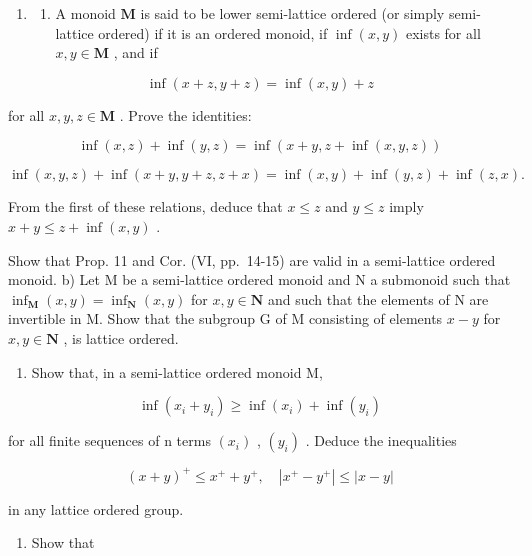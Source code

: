 \begin{enumerate}
\def\labelenumi{\arabic{enumi})}
\setcounter{enumi}{12}
\tightlist
\item
  \begin{enumerate}
  \def\labelenumii{\alph{enumii})}
  \tightlist
  \item
    A monoid \(\mathbf{M}\) is said to be lower semi-lattice ordered (or simply semi-lattice ordered) if it is an ordered monoid, if \(\inf(x, y)\) exists for all \(x, y \in \mathbf{M}\) , and if
  \end{enumerate}
\end{enumerate}

\[
\inf (x + z, y + z) = \inf (x, y) + z
\]

for all \(x, y, z \in \mathbf{M}\) . Prove the identities:

\[
\inf (x, z) + \inf (y, z) = \inf (x + y, z + \inf (x, y, z))
\]

\[
\inf (x, y, z) + \inf (x + y, y + z, z + x) = \inf (x, y) + \inf (y, z) + \inf (z, x).
\]

From the first of these relations, deduce that \(x \leqslant z\) and \(y \leqslant z\) imply \(x + y \leqslant z + \inf(x, y)\) .

Show that Prop. 11 and Cor. (VI, pp.~14-15) are valid in a semi-lattice ordered monoid. b) Let M be a semi-lattice ordered monoid and N a submonoid such that \(\inf_{\mathbf{M}}(x,y) = \inf_{\mathbf{N}}(x,y)\) for \(x,y\in \mathbf{N}\) and such that the elements of N are invertible in M. Show that the subgroup G of M consisting of elements \(x - y\) for \(x,y\in \mathbf{N}\) , is lattice ordered.

\begin{enumerate}
\def\labelenumi{\arabic{enumi})}
\setcounter{enumi}{13}
\tightlist
\item
  Show that, in a semi-lattice ordered monoid M,
\end{enumerate}

\[
\inf \left(x _ {i} + y _ {i}\right) \geqslant \inf \left(x _ {i}\right) + \inf \left(y _ {i}\right)
\]

for all finite sequences of n terms \((x_{i})\) , \((y_{i})\) . Deduce the inequalities

\[
(x + y) ^ {+} \leqslant x ^ {+} + y ^ {+}, \quad | x ^ {+} - y ^ {+} | \leqslant | x - y |
\]

in any lattice ordered group.

\begin{enumerate}
\def\labelenumi{\arabic{enumi})}
\setcounter{enumi}{14}
\tightlist
\item
  Show that
\end{enumerate}

